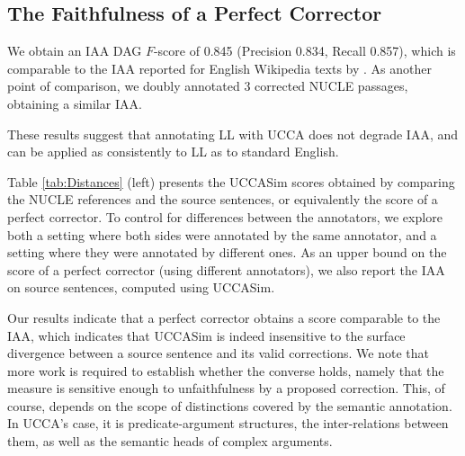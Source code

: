 \documentclass[letter,11pt]{article}
\begin{document}
%
%
%
\subsection{The Faithfulness of a Perfect Corrector}
We obtain an IAA DAG $F$-score of 0.845
(Precision 0.834, Recall 0.857), which
is comparable to the IAA reported for English Wikipedia texts by \cite{abend2013universal}.
As another point of comparison, we doubly annotated 3 corrected
NUCLE passages, obtaining a similar IAA.

These results suggest that annotating LL with UCCA does not degrade IAA, and can be applied as consistently to LL as to standard English.

Table \ref{tab:Distances} (left)
presents the {\sc UCCASim} scores obtained by comparing the NUCLE references and the source
sentences, or equivalently the score of a perfect corrector.
To control for differences between the annotators, we explore both
a setting where both sides were annotated by the same annotator,
and a setting where they were annotated by different ones.
As an upper bound on the score of a perfect corrector (using different annotators),
we also report the IAA on source sentences, computed using {\sc UCCASim}. 

Our results indicate that a perfect corrector obtains a score comparable
to the IAA, which indicates that {\sc UCCASim} is indeed
insensitive to the surface divergence between a source sentence and its valid corrections.
We note that more work is required to establish whether the converse holds, namely
that the measure is sensitive enough
to unfaithfulness by a proposed correction.
This, of course, depends on the scope of distinctions covered by the semantic annotation.
In UCCA's case, it is predicate-argument structures, the inter-relations between them,
as well as the semantic heads of complex arguments.
\end{document}
